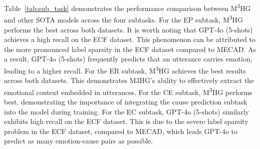 \documentclass[11pt]{article}
\begin{document}
Table~\ref{tab:sub_task} demonstrates the performance comparison between M\textsuperscript{3}HG and other SOTA models across the four subtasks.
For the EP subtask, M\textsuperscript{3}HG performs the best across both datasets.
It is worth noting that GPT-4o (5-shots) achieves a high recall on the ECF dataset. 
This phenomenon can be attributed to the more pronounced label sparsity in the ECF dataset compared to MECAD. 
As a result, GPT-4o (5-shots) frequently predicts that an utterance carries emotion, leading to a higher recall.
For the ER subtask, M\textsuperscript{3}HG achieves the best results across both datasets.
This demonstrates M3HG’s ability to effectively extract the emotional context embedded in utterances.
For the CE subtask, M\textsuperscript{3}HG performs best, demonstrating the importance of integrating the cause prediction subtask into the model during training.
For the EC subtask, GPT-4o (5-shots) similarly exhibits high recall on the ECF dataset. 
This is due to the severe label sparsity problem in the ECF dataset, compared to MECAD, which leads GPT-4o to predict as many emotion-cause pairs as possible.
\end{document}
